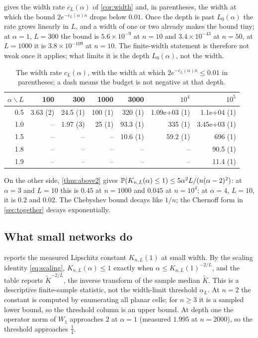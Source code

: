  gives the width rate $c_L(\alpha)$ of \cref{cor:width} and, in parentheses, the width at which the bound $2e^{-c_L(\alpha)n}$ drops below $0.01$. Once the depth is past $L_0(\alpha)$ the rate grows linearly in $L$, and a width of one or two already makes the bound tiny; at $\alpha=1$, $L=300$ the bound is $5.6\times10^{-9}$ at $n=10$ and $3.4\times10^{-43}$ at $n=50$, at $L=1000$ it is $3.8\times10^{-109}$ at $n=10$. The finite-width statement is therefore not weak once it applies; what limits it is the depth $L_0(\alpha)$, not the width.

\begin{table}[h]\centering
\begin{tabular}{rrrrrrr}
\toprule
$\alpha\backslash L$ & 100 & 300 & 1000 & 3000 & $10^4$ & $10^5$\\
\midrule
0.5 & 3.63 (2) & 24.5 (1) & 100 (1) & 320 (1) & 1.09e+03 (1) & 1.1e+04 (1)\\
1.0 & -- & 1.97 (3) & 25 (1) & 93.3 (1) & 335 (1) & 3.45e+03 (1)\\
1.5 & -- & -- & -- & 10.6 (1) & 59.2 (1) & 696 (1)\\
1.8 & -- & -- & -- & -- & -- & 90.5 (1)\\
1.9 & -- & -- & -- & -- & -- & 11.4 (1)\\
\bottomrule
\end{tabular}
\caption{The width rate $c_L(\alpha)$, with the width at which $2e^{-c_L(\alpha)n}\le0.01$ in parentheses; a dash means the budget is not negative at that depth.}
\label{tab:rate}
\end{table}

On the other side, \cref{thm:above2} gives $\mathbb{P}(K_{n,L}(\alpha)\le1)\le5\alpha^2L/(n(\alpha-2)^2)$: at $\alpha=3$ and $L=10$ this is $0.45$ at $n=1000$ and $0.045$ at $n=10^4$; at $\alpha=4$, $L=10$, it is $0.2$ and $0.02$. The Chebyshev bound decays like $1/n$; the Chernoff form in \cref{sec:together} decays exponentially.

\subsection{What small networks do}

 reports the measured Lipschitz constant $K_{n,L}(1)$ at small width. By the scaling identity \cref{eq:scaling}, $K_{n,L}(\alpha)\le1$ exactly when $\alpha\le K_{n,L}(1)^{-2/L}$, and the table reports $\widetilde K^{-2/L}$, the inverse transform of the sample median $\widetilde K$. This is a descriptive finite-sample statistic, not the width-limit threshold $\alpha_L$. At $n=2$ the constant is computed by enumerating all planar cells; for $n\ge3$ it is a sampled lower bound, so the threshold column is an upper bound. At depth one the operator norm of $W_1$ approaches $2$ at $\alpha=1$ (measured $1.995$ at $n=2000$), so the threshold approaches $\tfrac14$.


